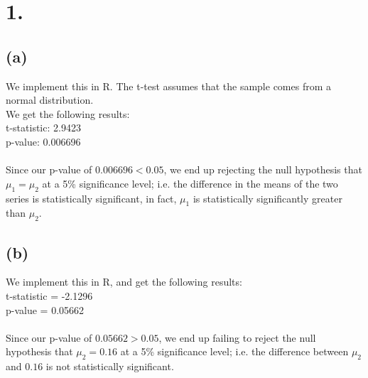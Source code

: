 \documentclass{article}
\begin{document}
\thispagestyle{firstpageheader}

\section*{1.}
{\Large 



\subsection*{(a)}

We implement this in R. The t-test assumes that the sample comes from a normal distribution.
\\
We get the following results: \\ 
t-statistic: 2.9423 \\
p-value: 0.006696 \\ \\
Since our p-value of $0.006696 < 0.05$, we end up rejecting the null hypothesis that $\mu_1 = \mu_2$ at a 5\% significance level; i.e. the difference in the means of the two series is statistically significant, in fact, $\mu_1$ is statistically significantly greater than $\mu_2$.

\subsection*{(b)}

We implement this in R, and get the following results: \\ 
t-statistic = -2.1296 \\
p-value = 0.05662 \\ \\ 
Since our p-value of $0.05662 > 0.05$, we end up failing to reject the null hypothesis that $\mu_2 = 0.16$ at a 5\% significance level; i.e. the difference between $\mu_2$ and $0.16$ is not statistically significant.
\newpage

}
\end{document}
